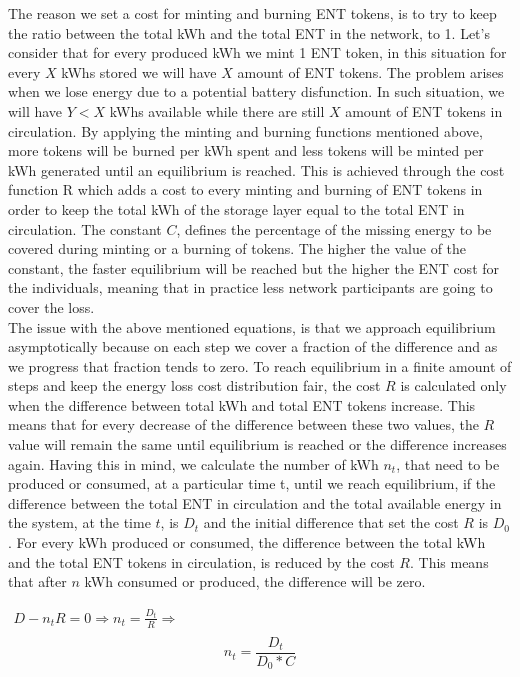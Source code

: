 The reason we set a cost for minting and burning ENT tokens, is to try to keep the ratio between the total kWh and the total ENT in the network, to 1. Let's consider that for every produced kWh we mint 1 ENT token, in this situation for every $X$ kWhs stored we will have $X$ amount of ENT tokens. 
The problem arises when we lose energy due to a potential battery disfunction. In such situation, we will have $Y<X$ kWhs available while there are still $X$ amount of ENT tokens in circulation. By applying the minting and burning
functions mentioned above, more tokens will be burned per kWh spent and less tokens will be minted per kWh generated until an equilibrium is reached. This is achieved through the cost function R which adds a cost to every minting 
and burning of ENT tokens in order to keep the total kWh of the storage layer equal to the total ENT in circulation. The constant $C$, defines the percentage of the missing energy to be covered during minting or a burning of tokens. The higher the value of the constant, 
the faster equilibrium will be reached but the higher the ENT cost for the individuals, meaning that in practice less network participants are going to cover the loss.\\
The issue with the above mentioned equations, is that we approach equilibrium asymptotically because on each step we cover a fraction of the difference and as we progress that fraction tends to zero. To reach equilibrium in a finite amount of steps and keep the energy loss cost distribution fair, 
the cost $R$ is calculated only when the difference between total kWh and total ENT tokens increase. This means that for every decrease of the difference between these two values, the $R$ value will remain the same until equilibrium is reached or the difference increases again. 
Having this in mind, we calculate the number of kWh $n_t$, that need to be produced or consumed, at a particular time t, until we reach equilibrium, if the difference between the total ENT in circulation and the total available energy in the system, at the time $t$, is $D_t$ and the initial difference that set the cost $R$ is $D_0$. 
For every kWh produced or consumed, the difference between the total kWh and the total ENT tokens in circulation, is reduced by the cost $R$. This means that after $n$ kWh consumed or produced, the difference will be zero.
\begin{center}
    \begin{math}
        \begin{array}{c}
        D-n_tR = 0 \Rightarrow n_t = \frac{D_t}{R} \Rightarrow\\
    \end{array}
    \end{math}
    \begin{equation}   
        \boxed{n_t = \frac{D_t}{D_0*C}}
        \label{equ:kwh_until_equilibrium}
    \end{equation}
\end{center}

